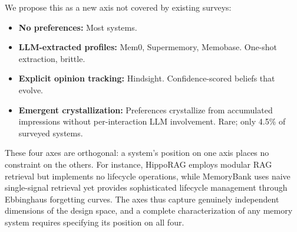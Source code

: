 We propose this as a new axis not covered by existing surveys:

\begin{itemize}[leftmargin=*, nosep]
    \item \textbf{No preferences:} Most systems.
    \item \textbf{LLM-extracted profiles:} Mem0, Supermemory, Memobase.
    One-shot extraction, brittle.
    \item \textbf{Explicit opinion tracking:} Hindsight. Confidence-scored
    beliefs that evolve.
    \item \textbf{Emergent crystallization:} Preferences crystallize
    from accumulated impressions without per-interaction LLM involvement.
    Rare; only 4.5\% of surveyed systems.
\end{itemize}

\medskip

These four axes are orthogonal: a system's position on one axis places
no constraint on the others. For instance, HippoRAG employs modular RAG
retrieval but implements no lifecycle operations, while MemoryBank uses
naive single-signal retrieval yet provides sophisticated lifecycle
management through Ebbinghaus forgetting curves. The axes thus capture
genuinely independent dimensions of the design space, and a complete
characterization of any memory system requires specifying its position
on all four.
